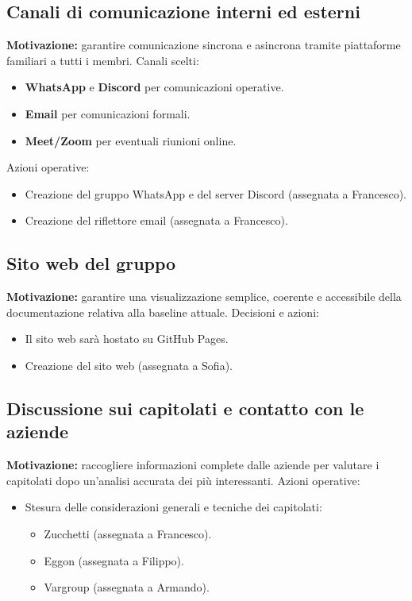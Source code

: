 \subsection{Canali di comunicazione interni ed esterni}
\textbf{Motivazione:} garantire comunicazione sincrona e asincrona tramite piattaforme familiari a tutti i membri.  
Canali scelti:
\begin{itemize}
    \item \textbf{WhatsApp} e \textbf{Discord} per comunicazioni operative.
    \item \textbf{Email} per comunicazioni formali.
    \item \textbf{Meet/Zoom} per eventuali riunioni online.
\end{itemize}
Azioni operative:
\begin{itemize}
    \item Creazione del gruppo WhatsApp e del server Discord (assegnata a Francesco).
    \item Creazione del riflettore email (assegnata a Francesco).
\end{itemize}

\subsection{Sito web del gruppo}
\textbf{Motivazione:} garantire una visualizzazione semplice, coerente e accessibile della documentazione relativa alla baseline attuale.  
Decisioni e azioni:
\begin{itemize}
    \item Il sito web sarà hostato su GitHub Pages.
    \item Creazione del sito web (assegnata a Sofia).
\end{itemize}

\subsection{Discussione sui capitolati e contatto con le aziende}
\textbf{Motivazione:} raccogliere informazioni complete dalle aziende per valutare i capitolati dopo un’analisi accurata dei più interessanti.  
Azioni operative:
\begin{itemize}
    \item Stesura delle considerazioni generali e tecniche dei capitolati:
    \begin{itemize}
        \item Zucchetti (assegnata a Francesco).
        \item Eggon (assegnata a Filippo).
        \item Vargroup (assegnata a Armando).
    \end{itemize}
\end{itemize}

